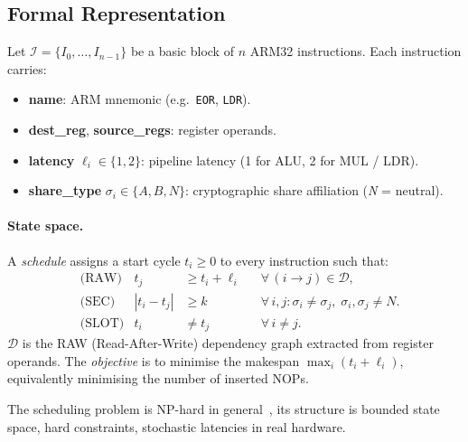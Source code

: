 \documentclass[letterpaper]{article}
\begin{document}
\subsection{Formal Representation}

Let $\mathcal{I} = \{I_0, \ldots, I_{n-1}\}$ be a basic block of $n$
ARM32 instructions.  Each instruction carries:
\begin{itemize}\setlength\itemsep{0pt}
  \item \textbf{name}: ARM mnemonic (e.g.\ \texttt{EOR}, \texttt{LDR}).
  \item \textbf{dest\_reg}, \textbf{source\_regs}: register operands.
  \item \textbf{latency} $\ell_i \in \{1, 2\}$: pipeline latency
        (1 for ALU, 2 for MUL / LDR).
  \item \textbf{share\_type} $\sigma_i \in \{A, B, N\}$: cryptographic
        share affiliation (\textit{N} = neutral).
\end{itemize}

\paragraph{State space.}
A \emph{schedule} assigns a start cycle $t_i \ge 0$ to every
instruction such that:
\begin{align}
   & \text{(RAW)}  & t_j                                                                               & \ge t_i + \ell_i
   &               & \forall\, (i \to j) \in \mathcal{D}, \label{eq:raw}                                                  \\
   & \text{(SEC)}  & |t_i - t_j|                                                                       & \ge k
   &               & \forall\, i,j : \sigma_i \ne \sigma_j,\; \sigma_i, \sigma_j \ne N. \label{eq:sec}                    \\
   & \text{(SLOT)} & t_i                                                                               & \ne t_j
   &               & \forall\, i \ne j. \label{eq:slot}
\end{align}
$\mathcal{D}$ is the RAW (Read-After-Write) dependency graph extracted
from register operands.  The \emph{objective} is to minimise the
makespan $\max_i(t_i + \ell_i)$, equivalently minimising the number of
inserted NOPs.

\begin{underhoodbox}
  The scheduling problem is NP-hard in general~\cite{ullman1975}, its
  structure is bounded state space, hard constraints, stochastic latencies in
  real hardware.
\end{underhoodbox}
\end{document}
